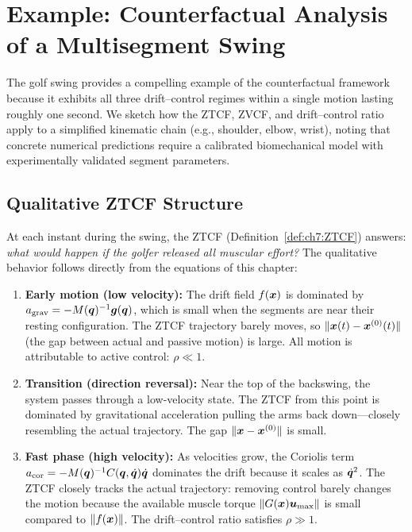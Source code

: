 \section{Example: Counterfactual Analysis of a Multisegment Swing}

The golf swing provides a compelling example of the counterfactual framework because it
exhibits all three drift--control regimes within a single motion lasting roughly one
second. We sketch how the ZTCF, ZVCF, and drift--control ratio apply to a simplified
kinematic chain (e.g., shoulder, elbow, wrist), noting that concrete numerical
predictions require a calibrated biomechanical model with experimentally validated
segment parameters.

\subsection{Qualitative ZTCF Structure}

At each instant during the swing, the ZTCF (Definition~\ref{def:ch7:ZTCF}) answers:
\emph{what would happen if the golfer released all muscular effort?} The qualitative
behavior follows directly from the equations of this chapter:

\begin{enumerate}
\item \textbf{Early motion (low velocity):} The drift field $f(\bm{x})$ is dominated by
      $a_{\text{grav}} = -M(\bm{q})^{-1}\bm{g}(\bm{q})$, which is small when the segments
      are near their resting configuration. The ZTCF trajectory barely moves, so
      $\|\bm{x}(t) - \bm{x}^{(0)}(t)\|$ (the gap between actual and passive motion) is large.
      All motion is attributable to active control: $\rho \ll 1$.

\item \textbf{Transition (direction reversal):} Near the top of the backswing, the
      system passes through a low-velocity state. The ZTCF from this point
      is dominated by gravitational acceleration pulling the arms back down---closely
      resembling the actual trajectory. The gap $\|\bm{x} - \bm{x}^{(0)}\|$ is small.

\item \textbf{Fast phase (high velocity):} As velocities grow, the Coriolis term
      $a_{\text{cor}} = -M(\bm{q})^{-1}C(\bm{q},\dot{\bm{q}})\dot{\bm{q}}$ dominates the drift because
      it scales as $\dot{\bm{q}}^2$. The ZTCF closely tracks the actual trajectory:
      removing control barely changes the motion because the available muscle torque
      $\|G(\bm{x})\bm{u}_{\max}\|$ is small compared to $\|f(\bm{x})\|$. The drift--control
      ratio satisfies $\rho \gg 1$.
\end{enumerate}

